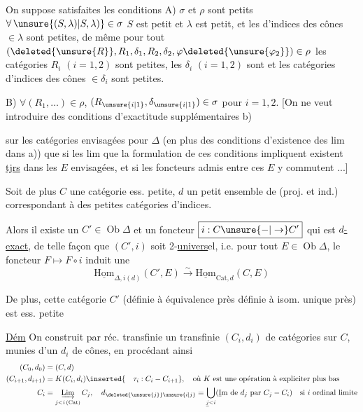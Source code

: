 On suppose satisfaites les conditions
A) $\sigma$ et $\rho$ sont petits  $\forall\,\unsure{(S,\lambda)|S,\lambda)}\in\sigma$ $S$ est petit et $\lambda$ est petit, et les   d'indices des cônes $\in\lambda$ sont petites, de même pour tout $(\deleted{\unsure{R}},R_1,\delta_1,R_2,\delta_2,\varphi\deleted{\unsure{\varphi_2}})\in\rho$ les catégories  $R_i$ $(i=1,2)$ sont petites, les $\delta_i$ $(i=1,2)$ sont  et les catégories d'indices des cônes $\in\delta_i$ sont petites.

B) $\forall(R_1,\ldots)\in\rho$, $(R_{\unsure{i|1}},\delta_{\unsure{i|1}})\in\sigma$ pour $i=1,2$.  [On ne veut introduire des conditions d'exactitude supplémentaires b)

sur les catégories envisagées  pour $\Delta$ (en plus des conditions d'existence des lim dans a)) que si les  lim que la formulation de ces conditions impliquent existent \uline{tjrs} dans les $E$ envisagées, et si les foncteurs admis entre ces $E$ y commutent ...]

Soit de plus $C$ une catégorie ess. petite, $d$  un petit ensemble de   (proj. et ind.)  correspondant à des petites catégories d'indices.

Alors il existe un \uline{$C'\in\operatorname{Ob}\Delta$} et un foncteur $\boxed{i:C\unsure{-|\to}C'}$ qui est \uline{$d$-exact}, de telle façon que $(C',i)$ soit 2-\uline{univers}el, i.e. pour tout $E\in\operatorname{Ob}\Delta$, le foncteur $F\longmapsto F\circ i$ induit une 
\[
 \underline{\mathrm{Hom}}_{\Delta,i(d)}(C',E)\xrightarrow{\sim}\underline{\mathrm{Hom}}_{\mathrm{Cat},d}(C,E)
\]

De plus, cette catégorie $C'$ (définie à équivalence  près définie à isom. unique près) est ess. petite

\uline{Dém} On construit par réc. transfinie un   transfinie $(C_i,d_i)$ de catégories sur $C$, munies d'un $d_i$  de cônes, en procédant ainsi
\[
 \begin{aligned}
 (C_0,d_0)&=(C,d)\\
 (C_{i+1},d_{i+1})&=K(C_i,d_i)\inserted{\quad\tau_i:C_i-C_{i+1}},\quad\text{où }K\text{ est une opération à expliciter plus bas}\\
 C_i&=\underset{j<i\,(\mathrm{Cat})}{\underrightarrow{\mathrm{Lim}}}\,C_j,\quad
 d_{\deleted{\unsure{j}}\unsure{i|j}}=\bigcup_{\underline j<i}(\underline{\mathrm I}\mathrm m\text{ de }d_j\text{ par }C_j-C_i)
 \quad\text{si }i\text{ ordinal limite}
 \end{aligned}
\]

